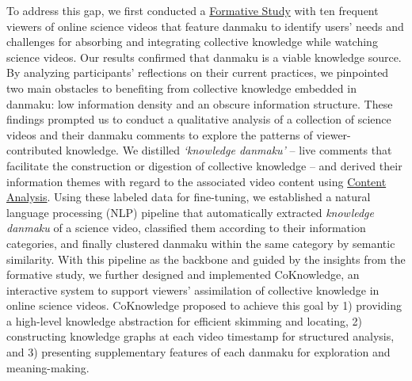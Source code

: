 To address this gap, we first conducted a \hyperref[formative-study]{Formative Study} with ten frequent viewers of online science videos that feature danmaku
to identify users' needs and challenges for absorbing and integrating collective knowledge while watching science videos.
Our results confirmed that danmaku is a viable knowledge source. 
By analyzing participants' reflections on their current practices, 
we pinpointed two main obstacles to benefiting from collective knowledge embedded in danmaku: low information density and an obscure information structure. 
These findings prompted us to conduct a qualitative analysis of a collection of science videos and their danmaku comments to explore the patterns of viewer-contributed knowledge.
We distilled \textit{`knowledge danmaku'} -- live comments that facilitate the construction or digestion of collective knowledge -- and derived their information themes with regard to the associated video content using \hyperref[content-analysis]{Content Analysis}.
Using these labeled data for fine-tuning,
we established a natural language processing (NLP) pipeline that automatically extracted \textit{knowledge danmaku} of a science video, classified them according to their information categories, 
and finally clustered danmaku within the same category by semantic similarity.
With this pipeline as the backbone and guided by the insights from the formative study, we further designed and implemented CoKnowledge, an interactive system to support viewers' assimilation of collective knowledge in online science videos.
CoKnowledge proposed to achieve this goal by 1) providing a high-level knowledge abstraction for efficient skimming and locating, 2) constructing knowledge graphs at each video timestamp for structured analysis, and 3) presenting supplementary features of each danmaku for exploration and meaning-making.
